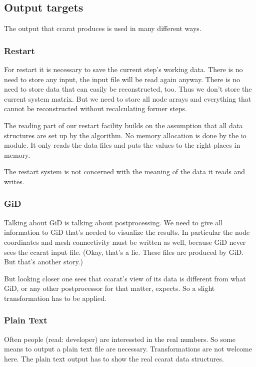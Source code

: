 \subsection{Output targets}

The output that ccarat produces is used in many different ways.


\subsubsection{Restart}

For restart it is necessary to save the current step's working data.
There is no need to store any input, the input file will be read again
anyway. There is no need to store data that can easily be reconstructed,
too. Thus we don't store the current system matrix. But we need to
store all node arrays and everything that cannot be reconstructed
without recalculating former steps.

The reading part of our restart facility builds on the assumption
that all data structures are set up by the algorithm. No memory allocation
is done by the io module. It only reads the data files and puts the
values to the right places in memory.

The restart system is not concerned with the meaning of the data it
reads and writes.


\subsubsection{GiD}

Talking about GiD is talking about postprocessing. We need to give
all information to GiD that's needed to visualize the results. In
particular the node coordinates and mesh connectivity must be written
as well, because GiD never sees the ccarat input file. (Okay, that's
a lie. These files are produced by GiD. But that's another story.)

But looking closer one sees that ccarat's view of its data is different
from what GiD, or any other postprocessor for that matter, expects.
So a slight transformation has to be applied.


\subsubsection{Plain Text}

Often people (read: developer) are interessted in the real numbers.
So some means to output a plain text file are necessary. Transformations
are not welcome here. The plain text output has to show the real ccarat
data structures.


